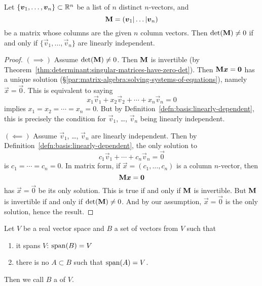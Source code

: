 \begin{theorem}
Let $\{\boldsymbol{v}_{1},\dots,\boldsymbol{v}_{n}\}\subset\mathbb{R}^{n}$ be a list of $n$
distinct $n$-vectors, and
\begin{equation}
\mathbf{M} = (\boldsymbol{v}_{1}|\dots|\boldsymbol{v}_{n})
\end{equation}
be a matrix whose columns are the given $n$ column vectors.
Then $\det(\mathbf{M})\neq0$ if and only if $\{\vec{v}_{1},\dots,\vec{v}_{n}\}$
are linearly independent.
\end{theorem}

\begin{proof}
$(\implies)$ Assume $\det(\mathbf{M})\neq0$. Then $\mathbf{M}$ is invertible
  (by Theorem~\ref{thm:determinant:singular-matrices-have-zero-det}).
Then $\mathbf{M}\boldsymbol{x}=\boldsymbol{0}$ has a unique solution (\S\ref{par:matrix-algebra:solving-systems-of-equations}), namely $\vec{x}=\vec{0}$.
This is equivalent to saying
\begin{equation}
x_{1}\vec{v}_{1} + x_{2}\vec{v}_{2} + \cdots + x_{n}\vec{v}_{n} = 0
\end{equation}
implies $x_{1}=x_{2}=\cdots=x_{n}=0$. But by Definition~\ref{defn:basis:linearly-dependent},
this is precisely the condition for $\vec{v}_{1}$, \dots, $\vec{v}_{n}$
being linearly independent.

$(\impliedby)$ Assume $\vec{v}_{1}$, \dots, $\vec{v}_{n}$ are linearly
independent. Then by Definition~\ref{defn:basis:linearly-dependent}, the
only solution to
\begin{equation}
c_{1}\vec{v}_{1} + \cdots + c_{n}\vec{v}_{n} = \vec{0}
\end{equation}
is $c_{1}=\cdots=c_{n}=0$. In matrix form, if $\vec{x}=(c_{1},\dots,c_{n})$
is a column $n$-vector, then
\begin{equation}
\mathbf{M}\boldsymbol{x} = \boldsymbol{0}
\end{equation}
has $\vec{x}=\vec{0}$ be its only solution. This is true if and only if
$\mathbf{M}$ is invertible. But $\mathbf{M}$ is invertible if and only if
$\det(\mathbf{M})\neq0$. And by our assumption, $\vec{x}=\vec{0}$ is the
only solution, hence the result.
\end{proof}

\begin{definition}
Let $V$ be a real vector space and $B$ a set of vectors from $V$ such
that
\begin{enumerate}
\item it spans $V$: $\operatorname{span}(B)=V$
\item there is no $A\subset B$ such that $\operatorname{span}(A)=V$.
\end{enumerate}
Then we call $B$ a  of $V$.
\end{definition}

